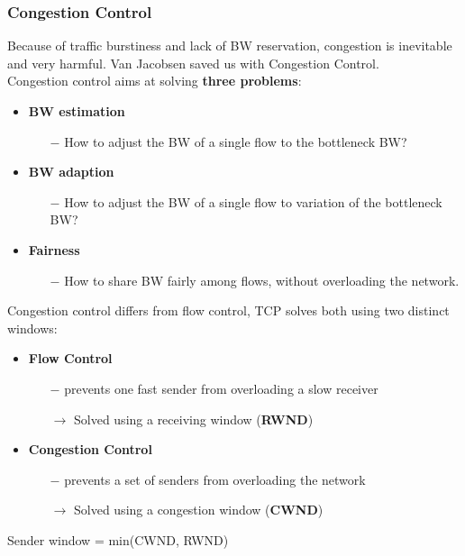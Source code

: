 \documentclass[a4paper, fontsize=8pt, landscape, DIV=1]{scrartcl}
\begin{document}
\begin{multicols*}{4}
		\subsubsection{Congestion Control}
		Because of traffic burstiness and lack of BW reservation, congestion is inevitable and very harmful. Van Jacobsen saved us with Congestion Control.\\
		Congestion control aims at solving \textbf{three problems}:
		\begin{itemize}[noitemsep]
			\item \textbf{BW estimation}
			\begin{itemize}
				\item[$-$] How to adjust the BW of a single flow to the bottleneck BW?
			\end{itemize}
			\item \textbf{BW adaption}
			\begin{itemize}
				\item[$-$] How to adjust the BW of a single flow to variation of the bottleneck BW?
			\end{itemize}
			\item \textbf{Fairness}
			\begin{itemize}
				\item[$-$] How to share BW fairly among flows, without overloading the network.
			\end{itemize} 
		\end{itemize}
		Congestion control differs from flow control, TCP solves both using two distinct windows:
		\begin{itemize}[noitemsep]
			\item \textbf{Flow Control}
			\begin{itemize}
				\item[$-$] prevents one fast sender from overloading a slow receiver
				\item[$\rightarrow$] Solved using a receiving window (\textbf{RWND}) 
			\end{itemize}
			\item \textbf{Congestion Control} 
			\begin{itemize}
				\item[$-$] prevents a set of senders from overloading the network
				\item[$\rightarrow$] Solved using a congestion window (\textbf{CWND})
			\end{itemize}
		\end{itemize}
		Sender window = min(CWND, RWND)\par 
		

\end{multicols*}
\end{document}
